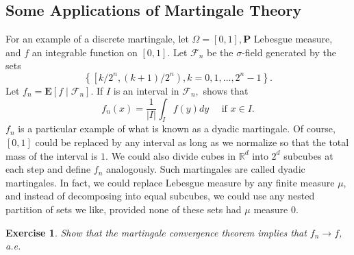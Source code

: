 \documentclass[twoside, 12pt]{book}
\numberwithin{equation}{chapter}
\newtheorem{exercise}{Exercise}[section]
\begin{document}
	\subsection{Some Applications of Martingale Theory}
	
	For an example of a discrete martingale, let $\Omega=[0,1], \mathbf{P}$ Lebesgue measure, and $f$ an integrable function on $[0,1]$. Let $\mathcal{F}_n$ be the $\sigma$-field generated by the sets 
	\[
	\left\{\left[k / 2^n,(k+1) / 2^n\right), k=0,1, \ldots, 2^n-1\right\}. 
	\]
	Let $f_n=\mathbf{E}\left[f \mid \mathcal{F}_n\right]$. If $I$ is an interval in $\mathcal{F}_n,$ shows that
	$$
	f_n(x)=\frac{1}{|I|} \int_I f(y) d y \quad \text { if } x \in I.
	$$
	$f_n$ is a particular example of what is known as a dyadic martingale. Of course, $[0,1]$ could be replaced by any interval as long as we normalize so that the total mass of the interval is $1$. We could also divide cubes in $\mathbb{R}^d$ into $2^d$ subcubes at each step and define $f_n$ analogously. Such martingales are called dyadic martingales. In fact, we could replace Lebesgue measure by any finite measure $\mu$, and instead of decomposing into equal subcubes, we could use any nested partition of sets we like, provided none of these sets had $\mu$ measure $0$.
	\begin{exercise}
		Show that the martingale convergence theorem implies that $f_n\to f$, a.e. 
	\end{exercise}
	
\end{document}
